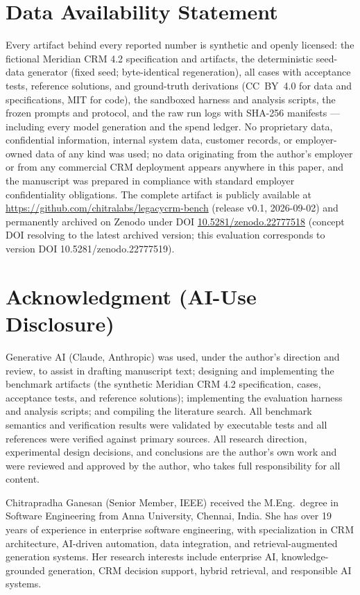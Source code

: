 \documentclass[journal]{IEEEtran}
\begin{document}
\section*{Data Availability Statement}
Every artifact behind every reported number is synthetic and openly licensed: the fictional
Meridian CRM 4.2 specification and artifacts, the deterministic seed-data generator (fixed
seed; byte-identical regeneration), all \NumCases{} cases with acceptance tests, reference
solutions, and ground-truth derivations (CC~BY~4.0 for data and specifications, MIT for
code), the sandboxed harness and analysis scripts, the frozen prompts and protocol, and the
raw run logs with SHA-256 manifests --- including every model generation and the spend
ledger. No proprietary data, confidential information, internal system data, customer
records, or employer-owned data of any kind was used; no data originating from the author's
employer or from any commercial CRM deployment appears anywhere in this paper, and the
manuscript was prepared in compliance with standard employer confidentiality obligations.
The complete artifact is publicly available at \url{https://github.com/chitralabs/legacycrm-bench} (release v0.1, 2026-09-02) and
permanently archived on Zenodo under DOI \href{https://doi.org/10.5281/zenodo.22777518}{10.5281/zenodo.22777518}
(concept DOI resolving to the latest archived version; this evaluation corresponds to
version DOI 10.5281/zenodo.22777519).

\section*{Acknowledgment (AI-Use Disclosure)}
Generative AI (Claude, Anthropic) was used, under the author's direction and review, to
assist in drafting manuscript text; designing and implementing the benchmark artifacts (the
synthetic Meridian CRM 4.2 specification, cases, acceptance tests, and reference solutions);
implementing the evaluation harness and analysis scripts; and compiling the literature
search. All benchmark semantics and verification results were validated by executable tests
and all references were verified against primary sources. All research direction,
experimental design decisions, and conclusions are the author's own work and were reviewed
and approved by the author, who takes full responsibility for all content.




\begin{IEEEbiographynophoto}{Chitrapradha Ganesan}
(Senior Member, IEEE) received the M.Eng.\ degree in Software Engineering from Anna
University, Chennai, India. She has over 19 years of experience in enterprise software
engineering, with specialization in CRM architecture, AI-driven automation, data
integration, and retrieval-augmented generation systems. Her research interests include
enterprise AI, knowledge-grounded generation, CRM decision support, hybrid retrieval, and
responsible AI systems.
\end{IEEEbiographynophoto}
\end{document}
